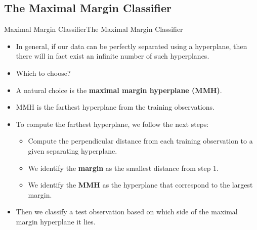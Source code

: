 \subsection{The Maximal Margin Classifier}
\begin{frame}{Maximal Margin Classifier}{The Maximal Margin Classifier}

    \begin{itemize}
        \item In general, if our data can be perfectly separated using a hyperplane, then there will in fact exist an infinite number of such hyperplanes. \pause 

        \item Which to choose? \pause 

        \item A natural choice is the \textbf{maximal margin hyperplane (MMH)}. \pause 
        
        \item MMH is the farthest hyperplane from the training observations. \pause  

        \item To compute the farthest hyperplane, we follow the next steps: \pause 

        \begin{itemize}
            \item Compute the perpendicular distance from each training observation to a given separating hyperplane. \pause 

            \item We identify the \textbf{margin} as the smallest distance from step 1.   \pause 

            \item We identify the \textbf{MMH} as the hyperplane that correspond to the largest margin. \pause 
        \end{itemize}

        \item Then we classify a test observation based on which side of the maximal margin hyperplane it lies.
    \end{itemize}
\end{frame}

